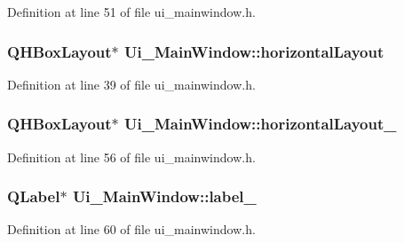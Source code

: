 Definition at line 51 of file ui\+\_\+mainwindow.\+h.

\hypertarget{class_ui___main_window_acd6fdc9ebacc4b25b834162380d75ce8}{}
\subsubsection[{horizontal\+Layout}]{\setlength{\rightskip}{0pt plus 5cm}Q\+H\+Box\+Layout$\ast$ Ui\+\_\+\+Main\+Window\+::horizontal\+Layout}\label{class_ui___main_window_acd6fdc9ebacc4b25b834162380d75ce8}


Definition at line 39 of file ui\+\_\+mainwindow.\+h.

\hypertarget{class_ui___main_window_a80867018070156432923d0266cc9fe25}{}
\subsubsection[{horizontal\+Layout\+\_\+2}]{\setlength{\rightskip}{0pt plus 5cm}Q\+H\+Box\+Layout$\ast$ Ui\+\_\+\+Main\+Window\+::horizontal\+Layout\+\_}\label{class_ui___main_window_a80867018070156432923d0266cc9fe25}


Definition at line 56 of file ui\+\_\+mainwindow.\+h.

\hypertarget{class_ui___main_window_ad6bab8fb8903b8f41afea1218ee52695}{}
\subsubsection[{label\+\_\+5}]{\setlength{\rightskip}{0pt plus 5cm}Q\+Label$\ast$ Ui\+\_\+\+Main\+Window\+::label\+\_}\label{class_ui___main_window_ad6bab8fb8903b8f41afea1218ee52695}


Definition at line 60 of file ui\+\_\+mainwindow.\+h.

\hypertarget{class_ui___main_window_a663f728e6244926a795c6e6892673b1d}{}
